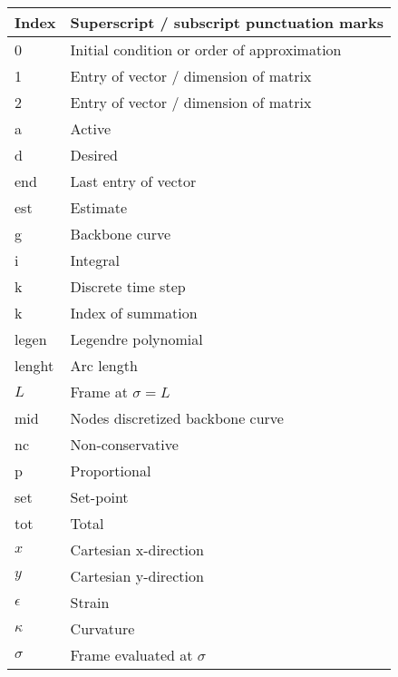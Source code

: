 \begin{spacing}{0.9}
\begin{multicols}{2}
\begin{table}[H]
\centering
    \begin{tabular}{p{1.5cm} p{5cm}} \hline
    \textbf{Index}    &   \textbf{Superscript / subscript punctuation marks}\\ \hline
    0     &  Initial condition or order of approximation \\
    1     &  Entry of vector / dimension of matrix \\
    2     &  Entry of vector / dimension of matrix \\
    a     &  Active \\
    d     &  Desired \\
    end   & Last entry of vector \\
    est   & Estimate \\
    g     & Backbone curve \\
    i     & Integral \\
    k     & Discrete time step \\
    k     & Index of summation \\
    legen & Legendre polynomial \\
    lenght & Arc length \\
    $L$   & Frame at $\sigma = L$ \\
    mid    & Nodes discretized backbone curve \\
    nc    & Non-conservative \\
    p    & Proportional \\
    set   & Set-point \\
    tot    & Total \\
    $x$    & Cartesian x-direction \\
    $y$    & Cartesian y-direction \\
    $\epsilon$  & Strain \\
    $\kappa$ & Curvature \\ 
    $\sigma$   & Frame evaluated at $\sigma$ \\\hline
    \end{tabular}
\end{table}







\end{multicols}
\end{spacing}
